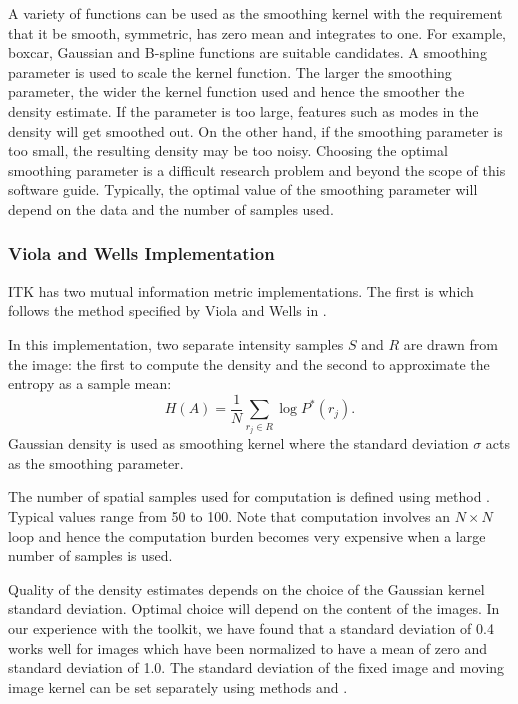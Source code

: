 A variety of functions can be used as the smoothing kernel with the
requirement that it be smooth, symmetric, has zero mean and
integrates to one. For example, boxcar, Gaussian and B-spline functions
are suitable candidates.
A smoothing parameter is used to scale the kernel function.
The larger the smoothing parameter, the wider the kernel function
used and hence the smoother the density estimate. If the parameter is
too large, features such as modes in the density will get smoothed out.
On the other hand, if the smoothing parameter is too small, the
resulting density may be too noisy. Choosing the optimal smoothing parameter 
is a difficult research 
problem and beyond the scope of this software guide.
Typically, the optimal value of the smoothing parameter will 
depend on the data and the number of samples used.

\subsubsection{Viola and Wells Implementation}
ITK has two mutual information metric implementations. The first is 
 which follows the method specified
by Viola and Wells in \cite{Viola1997}.


In this implementation, two separate intensity samples $S$ and $R$ are drawn
from the image: the first to compute the density and the second to approximate
the entropy as a sample mean:
\begin{equation}
H(A) = \frac{1}{N} \sum_{r_j \in R} \log P^{*}(r_j).
\end{equation}
Gaussian density is used as smoothing kernel where the standard deviation
$\sigma$ acts as the smoothing parameter.


The number of spatial samples used for computation is defined using
method . Typical values range from 50 to 100.
Note that computation involves an $N \times N$ loop and hence the computation
burden becomes very expensive when a large number of samples is used.

Quality of the density estimates depends on the choice of the Gaussian kernel
standard deviation. Optimal choice will depend on the content of the images.
In our experience with the toolkit, we have found that a standard deviation
of 0.4 works well for images which have been normalized to have a mean
of zero and standard deviation of 1.0. The standard deviation of the fixed image
and moving image kernel can be set separately using methods 
 and .

